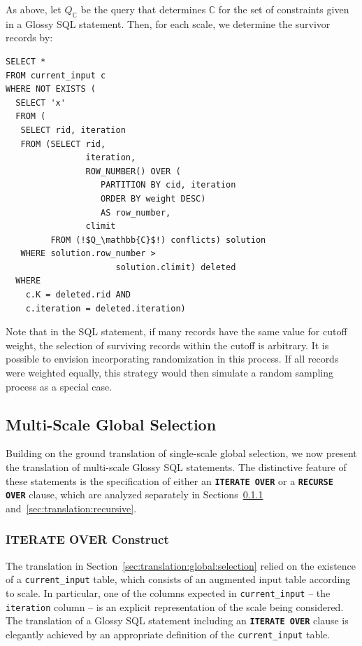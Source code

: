 \documentclass[11pt, oneside]{report}
\begin{document}
As above, let $Q_\mathbb{C}$ be the query that determines $\mathbb{C}$ for the set of constraints given in a Glossy SQL statement. Then, for each scale, we determine the survivor records by: 

\begin{lstlisting}[escapechar=!]
SELECT *
FROM current_input c
WHERE NOT EXISTS (
  SELECT 'x'
  FROM (
   SELECT rid, iteration
   FROM (SELECT rid,
                iteration, 
                ROW_NUMBER() OVER (
                   PARTITION BY cid, iteration 
                   ORDER BY weight DESC) 
                   AS row_number, 
                climit
         FROM (!$Q_\mathbb{C}$!) conflicts) solution
   WHERE solution.row_number >
                      solution.climit) deleted
  WHERE 
    c.K = deleted.rid AND
    c.iteration = deleted.iteration)
\end{lstlisting}

Note that in the SQL statement, if many records have the same value for cutoff weight, the selection of surviving records within the cutoff is arbitrary. It is possible to envision incorporating randomization in this process. If all records were weighted equally, this strategy would then simulate a random sampling process as a special case. 

\subsection{Multi-Scale Global Selection}
\label{sec:translation:multiscale}

Building on the ground translation of single-scale global selection, we now present the translation of multi-scale Glossy SQL statements. The distinctive feature of these statements is the specification of either an \textbf{\texttt{ITERATE OVER}} or a \textbf{\texttt{RECURSE OVER}} clause, which are analyzed separately in Sections~\ref{sec:translation:iterative} and~\ref{sec:translation:recursive}.   

\subsubsection{ITERATE OVER Construct}
\label{sec:translation:iterative}

The translation in Section~\ref{sec:translation:global:selection} relied on the existence of a \texttt{current\_input} table, which consists of an augmented input table according to scale. In particular, one of the columns expected in \texttt{current\_input} -- the \texttt{iteration} column -- is an explicit representation of the scale being considered. The translation of a Glossy SQL statement including an \textbf{\texttt{ITERATE OVER}} clause is elegantly achieved by an appropriate definition of the \texttt{current\_input} table.
\end{document}
